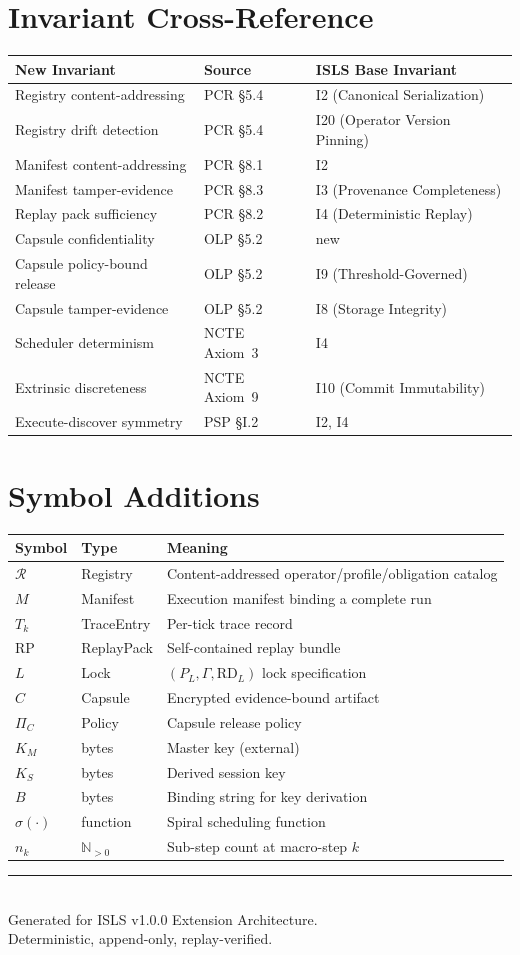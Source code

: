 \documentclass[11pt,a4paper,twoside]{article}
\theoremstyle{definition}
\theoremstyle{plain}
\theoremstyle{remark}
\newcommand{\ISLS}{\textsf{ISLS}}
\newcommand{\NN}{\mathbb{N}}
\newcommand{\calR}{\mathcal{R}}
\begin{document}
\section{Invariant Cross-Reference}\label{app:invariants}

\begin{longtable}{l l l}
\toprule
\textbf{New Invariant} & \textbf{Source} & \textbf{ISLS Base Invariant} \\
\midrule
Registry content-addressing & PCR \S5.4 & I2 (Canonical Serialization) \\
Registry drift detection & PCR \S5.4 & I20 (Operator Version Pinning) \\
Manifest content-addressing & PCR \S8.1 & I2 \\
Manifest tamper-evidence & PCR \S8.3 & I3 (Provenance Completeness) \\
Replay pack sufficiency & PCR \S8.2 & I4 (Deterministic Replay) \\
Capsule confidentiality & OLP \S5.2 & new \\
Capsule policy-bound release & OLP \S5.2 & I9 (Threshold-Governed) \\
Capsule tamper-evidence & OLP \S5.2 & I8 (Storage Integrity) \\
Scheduler determinism & NCTE Axiom~3 & I4 \\
Extrinsic discreteness & NCTE Axiom~9 & I10 (Commit Immutability) \\
Execute-discover symmetry & PSP \S I.2 & I2, I4 \\
\bottomrule
\end{longtable}

\section{Symbol Additions}\label{app:symbols}

\begin{tabular}{l l l}
\toprule
\textbf{Symbol} & \textbf{Type} & \textbf{Meaning} \\
\midrule
$\calR$ & Registry & Content-addressed operator/profile/obligation catalog \\
$M$ & Manifest & Execution manifest binding a complete run \\
$T_k$ & TraceEntry & Per-tick trace record \\
$\mathrm{RP}$ & ReplayPack & Self-contained replay bundle \\
$L$ & Lock & $(P_L, \Gamma, \mathrm{RD}_L)$ lock specification \\
$C$ & Capsule & Encrypted evidence-bound artifact \\
$\Pi_C$ & Policy & Capsule release policy \\
$K_M$ & bytes & Master key (external) \\
$K_S$ & bytes & Derived session key \\
$B$ & bytes & Binding string for key derivation \\
$\sigma(\cdot)$ & function & Spiral scheduling function \\
$n_k$ & $\NN_{>0}$ & Sub-step count at macro-step $k$ \\
\bottomrule
\end{tabular}

\vfill
\begin{center}
\rule{0.5\textwidth}{0.4pt}\\[0.5cm]
{\small Generated for \ISLS{} v1.0.0 Extension Architecture.\\
Deterministic, append-only, replay-verified.}
\end{center}
\end{document}
